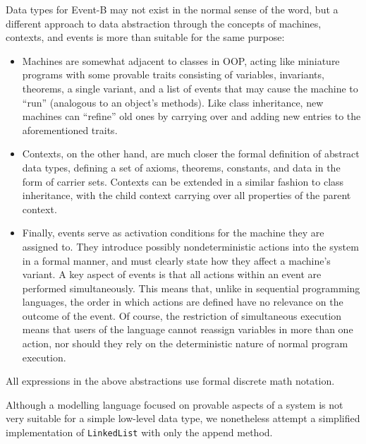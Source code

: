 \documentclass{article}
\begin{document}
Data types for Event-B may not exist in the normal sense of the word, but a different approach to data abstraction
through the concepts of machines, contexts, and events is more than suitable for the same purpose:
\begin{itemize}
    \item Machines are somewhat adjacent to classes in OOP, acting like miniature
    programs with some provable traits consisting of variables, invariants, theorems, a single variant, and a list of
    events that may cause the machine to ``run'' (analogous to an object's methods).
    Like class inheritance, new machines can ``refine'' old ones by
    carrying over and adding new entries to the aforementioned traits.
    \item Contexts, on the other hand, are much closer the formal definition of abstract data types,
    defining a set of axioms, theorems, constants, and data in the form of carrier sets.
    Contexts can be extended in a similar fashion to class inheritance, with the child context carrying over all properties
    of the parent context.
    \item Finally, events serve as activation conditions for the machine they are assigned to.
    They introduce possibly nondeterministic actions into the system in a formal manner, and must clearly state
    how they affect a machine's variant. A key aspect of events is that all actions within an event are performed simultaneously.
    This means that, unlike in sequential programming languages, the order in which actions are defined have no relevance
    on the outcome of the event. Of course, the restriction of simultaneous execution means that users of the language
    cannot reassign variables in more than one action, nor should they rely on the deterministic nature of normal program execution.
\end{itemize}
All expressions in the above abstractions use formal discrete math notation.

Although a modelling language focused on provable aspects of a system
is not very suitable for a simple low-level data type,
we nonetheless attempt a simplified implementation of \texttt{LinkedList} with only the append method.
\end{document}
